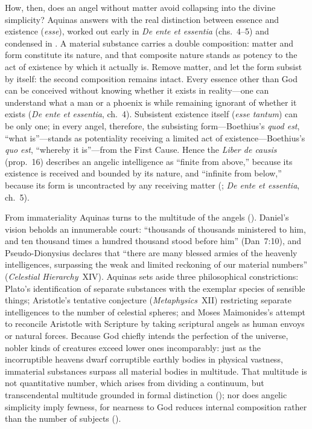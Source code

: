 How, then, does an angel without matter avoid collapsing into the divine simplicity? Aquinas answers with the real distinction between essence and existence (\emph{esse}), worked out early in \emph{De ente et essentia} (chs.~4--5) and condensed in . A material substance carries a double composition: matter and form constitute its nature, and that composite nature stands as potency to the act of existence by which it actually is. Remove matter, and let the form subsist by itself: the second composition remains intact. Every essence other than God can be conceived without knowing whether it exists in reality---one can understand what a man or a phoenix is while remaining ignorant of whether it exists (\emph{De ente et essentia}, ch.~4). Subsistent existence itself (\emph{esse tantum}) can be only one; in every angel, therefore, the subsisting form---Boethius's \emph{quod est}, ``what is''---stands as potentiality receiving a limited act of existence---Boethius's \emph{quo est}, ``whereby it is''---from the First Cause. Hence the \emph{Liber de causis} (prop.~16) describes an angelic intelligence as ``finite from above,'' because its existence is received and bounded by its nature, and ``infinite from below,'' because its form is uncontracted by any receiving matter (; \emph{De ente et essentia}, ch.~5).

From immateriality Aquinas turns to the multitude of the angels (). Daniel's vision beholds an innumerable court: ``thousands of thousands ministered to him, and ten thousand times a hundred thousand stood before him'' (Dan~7:10), and Pseudo-Dionysius declares that ``there are many blessed armies of the heavenly intelligences, surpassing the weak and limited reckoning of our material numbers'' (\emph{Celestial Hierarchy}~XIV). Aquinas sets aside three philosophical constrictions: Plato's identification of separate substances with the exemplar species of sensible things; Aristotle's tentative conjecture (\emph{Metaphysics}~XII) restricting separate intelligences to the number of celestial spheres; and Moses Maimonides's attempt to reconcile Aristotle with Scripture by taking scriptural angels as human envoys or natural forces. Because God chiefly intends the perfection of the universe, nobler kinds of creatures exceed lower ones incomparably: just as the incorruptible heavens dwarf corruptible earthly bodies in physical vastness, immaterial substances surpass all material bodies in multitude. That multitude is not quantitative number, which arises from dividing a continuum, but transcendental multitude grounded in formal distinction (); nor does angelic simplicity imply fewness, for nearness to God reduces internal composition rather than the number of subjects ().

